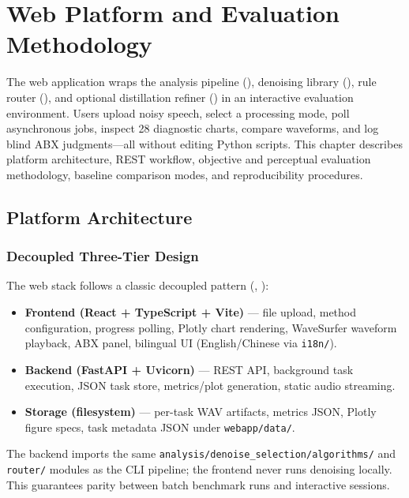 \chapter{Web Platform and Evaluation Methodology}
\label{ch:web}

The \projectshort{} web application wraps the analysis pipeline (), denoising library (), rule router (), and optional distillation refiner () in an interactive evaluation environment. Users upload noisy speech, select a processing mode, poll asynchronous jobs, inspect 28 diagnostic charts, compare waveforms, and log blind ABX judgments---all without editing Python scripts. This chapter describes platform architecture, REST workflow, objective and perceptual evaluation methodology, baseline comparison modes, and reproducibility procedures.

\section{Platform Architecture}
\label{sec:web_arch}

\subsection{Decoupled Three-Tier Design}

The web stack follows a classic decoupled pattern (, ):

\begin{itemize}
  \item \textbf{Frontend (React + TypeScript + Vite)} --- file upload, method configuration, progress polling, Plotly chart rendering, WaveSurfer waveform playback, ABX panel, bilingual UI (English/Chinese via \texttt{i18n/}).
  \item \textbf{Backend (FastAPI + Uvicorn)} --- REST API, background task execution, JSON task store, metrics/plot generation, static audio streaming.
  \item \textbf{Storage (filesystem)} --- per-task WAV artifacts, metrics JSON, Plotly figure specs, task metadata JSON under \texttt{webapp/data/}.
\end{itemize}

The backend imports the same \texttt{analysis/denoise\_selection/algorithms/} and \texttt{router/} modules as the CLI pipeline; the frontend never runs denoising locally. This guarantees parity between batch benchmark runs and interactive sessions.

